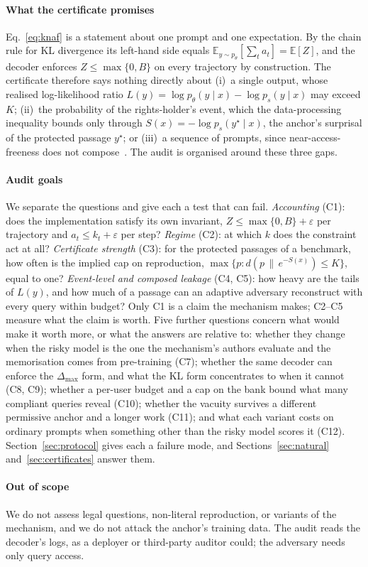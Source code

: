 \paragraph{What the certificate promises}
Eq.~\eqref{eq:knaf} is a statement about one prompt and one expectation. By the chain rule for KL divergence its left-hand side equals $\mathbb{E}_{y \sim p_\theta}[\sum_t a_t] = \mathbb{E}[Z]$, and the decoder enforces $Z \le \max\{0, B\}$ on every trajectory by construction. The certificate therefore says nothing directly about (i)~a single output, whose realised log-likelihood ratio $L(y) = \log p_\theta(y \mid x) - \log p_s(y \mid x)$ may exceed $K$; (ii)~the probability of the rights-holder's event, which the data-processing inequality bounds only through $S(x) = -\log p_s(y^\star \mid x)$, the anchor's surprisal of the protected passage $y^\star$; or (iii)~a sequence of prompts, since near-access-freeness does not compose~\cite{cohen2025blameless}. The audit is organised around these three gaps.

\paragraph{Audit goals}
We separate the questions and give each a test that can fail. \emph{Accounting} (C1): does the implementation satisfy its own invariant, $Z \le \max\{0,B\}+\varepsilon$ per trajectory and $a_t \le k_t + \varepsilon$ per step? \emph{Regime} (C2): at which $k$ does the constraint act at all? \emph{Certificate strength} (C3): for the protected passages of a benchmark, how often is the implied cap on reproduction, $\max\{p : d(p \,\|\, e^{-S(x)}) \le K\}$, equal to one? \emph{Event-level and composed leakage} (C4, C5): how heavy are the tails of $L(y)$, and how much of a passage can an adaptive adversary reconstruct with every query within budget? Only C1 is a claim the mechanism makes; C2--C5 measure what the claim is worth. Five further questions concern what would make it worth more, or what the answers are relative to: whether they change when the risky model is the one the mechanism's authors evaluate and the memorisation comes from pre-training (C7); whether the same decoder can enforce the $\Delta_{\max}$ form, and what the KL form concentrates to when it cannot (C8, C9); whether a per-user budget and a cap on the bank bound what many compliant queries reveal (C10); whether the vacuity survives a different permissive anchor and a longer work (C11); and what each variant costs on ordinary prompts when something other than the risky model scores it (C12). Section~\ref{sec:protocol} gives each a failure mode, and Sections~\ref{sec:natural} and~\ref{sec:certificates} answer them.

\paragraph{Out of scope}
We do not assess legal questions, non-literal reproduction, or variants of the mechanism, and we do not attack the anchor's training data. The audit reads the decoder's logs, as a deployer or third-party auditor could; the adversary needs only query access.

